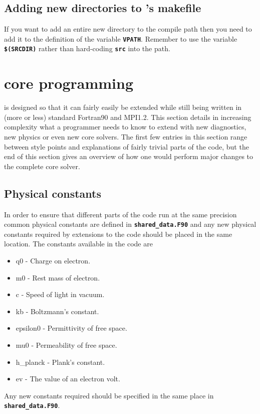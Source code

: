 \documentclass[12pt,a4paper]{article}
\newcommand{\inlinecode}[1]{{\color{warwickred} \bf\texttt{#1}}}
\newcommand{\EPOCH}{{\color{warwickdark}\fontfamily{phv}\selectfont{EPOCH}}}
\begin{document}
\subsection{Adding new directories to {\EPOCH}'s makefile}
If you want to add an entire new directory to the {\EPOCH} compile path then
you need to add it to the definition of the variable \inlinecode{VPATH}.
Remember to use the variable \inlinecode{\$(SRCDIR)} rather than hard-coding
\inlinecode{src} into the path.

\section{{\EPOCH} core programming}

{\EPOCH} is designed so that it can fairly easily be extended while still being
written in (more or less) standard Fortran90 and MPI1.2. This section details
in increasing complexity what a programmer needs to know to extend {\EPOCH} with
new diagnostics, new physics or even new core solvers. The first few entries
in this section range between style points and explanations of fairly trivial
parts of the {\EPOCH} code, but the end of this section gives an overview of how
one would perform major changes to the complete {\EPOCH} core solver.

\subsection{Physical constants}
In order to ensure that different parts of the code run at the same precision
common physical constants are defined in \inlinecode{shared\_data.F90} and any
new physical constants required by extensions to the code should be placed in
the same location. The constants available in the code are
\begin{itemize}
\item q0 - Charge on electron.
\item m0 - Rest mass of electron.
\item c - Speed of light in vacuum.
\item kb - Boltzmann's constant.
\item epsilon0 - Permittivity of free space.
\item mu0 - Permeability of free space.
\item h\_planck - Plank's constant.
\item ev - The value of an electron volt.
\end{itemize}

Any new constants required should be specified in the same place in
\inlinecode{shared\_data.F90}.
\end{document}
